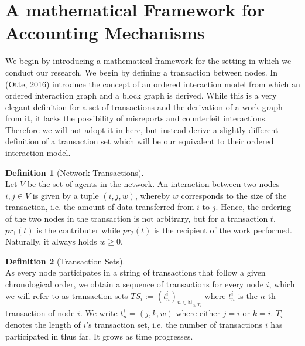 \documentclass[11pt,a4paper]{report}
\theoremstyle{definition}
\newtheorem{definition}{Definition}[section]
\theoremstyle{theorem}
\theoremstyle{proposition}
\theoremstyle{corollary}
\theoremstyle{lemma}
\theoremstyle{example}
\theoremstyle{remark}
\begin{document}
\section{A mathematical Framework for Accounting Mechanisms}
\label{sec:A mathematical Framework for Accounting Mechanisms}
\noindent{}We begin by introducing a mathematical framework for the setting in which we conduct our research. We begin by defining a transaction between nodes. In \cite{Sybil-resistant Trust Mechanisms in Distributed Systems} (Otte, 2016) introduce the concept of an ordered interaction model from which an ordered interaction graph and a block graph is derived. While this is a very elegant definition for a set of transactions and the derivation of a work graph from it, it lacks the possibility of misreports and counterfeit interactions. Therefore we will not adopt it in here, but instead derive a slightly different definition of a transaction set which will be our equivalent to their ordered interaction model.\vspace{1em}\\


\begin{definition}[Network Transactions]\ \\
Let $V$ be the set of agents in the network. An interaction between two nodes $i,j\in{}V$ is given by a tuple $(i,j,w)$, whereby $w$ corresponds to the size of the transaction, i.e. the amount of data transferred from $i$ to $j$. Hence, the ordering of the two nodes in the transaction is not arbitrary, but for a transaction $t$, $pr_1(t)$ is the contributer while $pr_2(t)$ is the recipient of the work performed. Naturally, it always holds $w\geq{}0$. \vspace{1em}\\
\end{definition}

\begin{definition}[Transaction Sets]\ \\
\noindent{}As every node participates in a string of transactions that follow a given chronological order, we obtain a sequence of transactions for every node $i$, which we will refer to as transaction sets $TS_i:=(t^i_n)_{n\in\mathbb{N}_{\leq{}T_i}}$ where $t^i_n$ is the $n$-th transaction of node $i$. We write $t^i_n=(j,k,w)$ where either $j=i$ or $k=i$. $T_i$ denotes the length of $i$'s transaction set, i.e. the number of transactions $i$ has participated in thus far. It grows as time progresses.\vspace{1em}\\
\end{definition}
\end{document}
